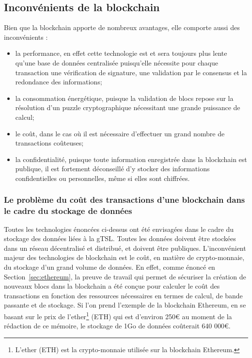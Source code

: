 \documentclass{tnreport}
\begin{document}
\subsection{Inconvénients de la blockchain}
\label{sec:drawbacks-blockchain}

Bien que la blockchain apporte de nombreux avantages, elle comporte aussi des inconvénients :
\begin{itemize}
	\item la performance, en effet cette technologie est et sera toujours plus lente qu'une base de données centralisée puisqu'elle nécessite pour chaque transaction une vérification de signature, une validation par le consensus et la redondance des informations; 
	\item la consommation énergétique, puisque la validation de blocs repose sur la résolution d'un puzzle cryptographique nécessitant une grande puissance de calcul; 
	\item le coût, dans le cas où il est nécessaire d'effectuer un grand nombre de transactions coûteuses;
	\item la confidentialité, puisque toute information enregistrée dans la blockchain est publique, il est fortement déconseillé d'y stocker des informations confidentielles ou personnelles, même si elles sont chiffrées.
\end{itemize}

\subsubsection{Le problème du coût des transactions d'une blockchain dans le cadre du stockage de données}

Toutes les technologies énoncées ci-dessus ont été envisagées dans le cadre du stockage des données liées à la gTSL. Toutes les données doivent être stockées dans un réseau décentralisé et distribué, et doivent être publiques. L'inconvénient majeur des technologies de blockchain est le coût, en matière de crypto-monnaie, du stockage d'un grand volume de données. En effet, comme énoncé en Section~\ref{sec:ethereum}, la preuve de travail qui permet de sécuriser la création de nouveaux blocs dans la blockchain a été conçue pour calculer le coût des transactions en fonction des ressources nécessaires en termes de calcul, de bande passante et de stockage. Si l'on prend l'exemple de la blockchain Ethereum, en se basant sur le prix de l'ether\footnote{L'ether (ETH) est la crypto-monnaie utilisée sur la blockchain Ethereum.} (ETH) qui est d'environ 250€ au moment de la rédaction de ce mémoire, le stockage de 1Go de données coûterait 640 000€.
\end{document}
